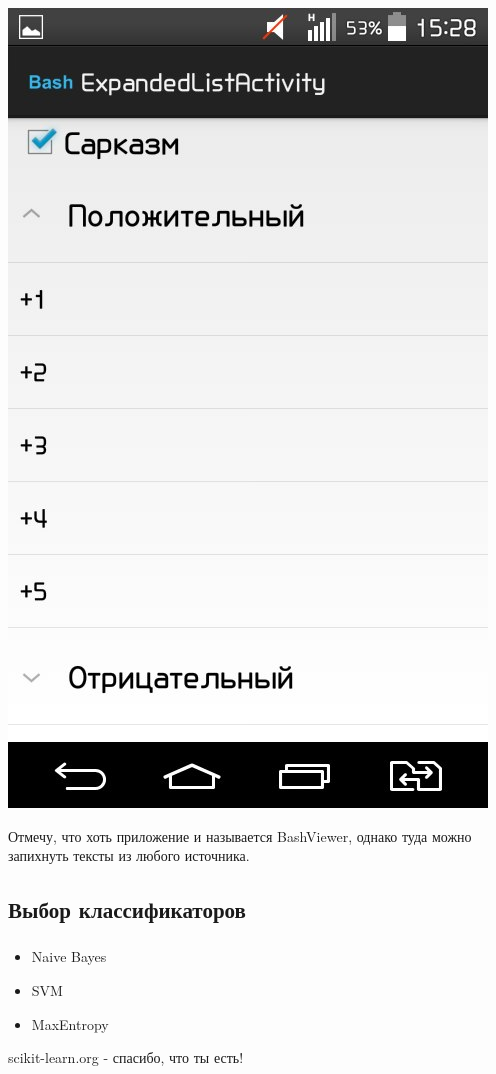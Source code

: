 \documentclass[t]{beamer}
\begin{document}
\begin{frame}
{		\includegraphics[scale = 0.17]{images/Bash3.jpg}}\pause	
	
		Отмечу, что хоть приложение и называется BashViewer, однако туда можно запихнуть тексты из любого источника. 
	\end{frame}

	\subsection{Выбор классификаторов}
	\begin{frame}
		\frametitle{\insertsection}
		\framesubtitle{\insertsubsection}
		
		\begin{itemize}
			\item 
			Naive Bayes
			\item
			SVM
			\item
			MaxEntropy			
		\end{itemize}\pause
		
		scikit-learn.org - спасибо, что ты есть!
		

	\end{frame}	
	
\end{document}

